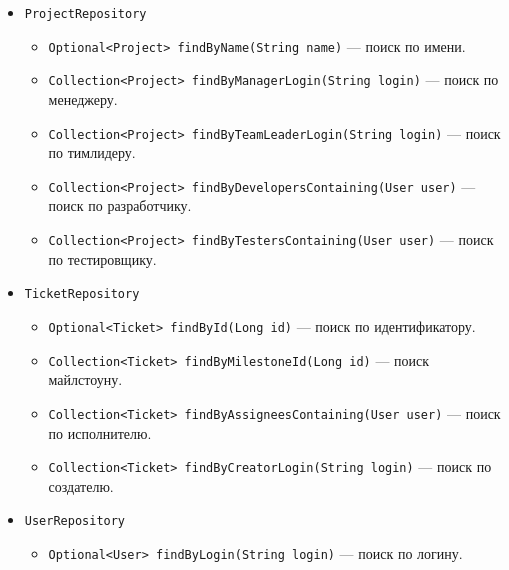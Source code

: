 \begin{itemize}
\item \texttt{ProjectRepository}
	\begin{itemize}
	\item \texttt{Optional<Project> findByName(String name)} --- поиск по имени.
	\item \texttt{Collection<Project> findByManagerLogin(String login)} --- поиск по менеджеру.
	\item \texttt{Collection<Project> findByTeamLeaderLogin(String login)} --- поиск по тимлидеру.
	\item \texttt{Collection<Project> findByDevelopersContaining(User user)} --- поиск по разработчику.
	\item \texttt{Collection<Project> findByTestersContaining(User user)} --- поиск по тестировщику.
	\end{itemize}
	
\item \texttt{TicketRepository}
	\begin{itemize}
	\item \texttt{Optional<Ticket> findById(Long id)} --- поиск по идентификатору.
	\item \texttt{Collection<Ticket> findByMilestoneId(Long id)} --- поиск майлстоуну.
	\item \texttt{Collection<Ticket> findByAssigneesContaining(User user)} --- поиск по исполнителю.
	\item \texttt{Collection<Ticket> findByCreatorLogin(String login)} --- поиск по создателю.
	\end{itemize}
	
\item \texttt{UserRepository}
	\begin{itemize}
	\item \texttt{Optional<User> findByLogin(String login)} --- поиск по логину.
	\end{itemize}
\end{itemize}


